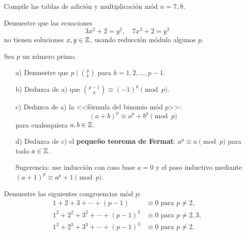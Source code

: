 \documentclass{article}
\begin{document}
\begin{problema}
  Compile las tablas de adición y multiplicación mód $n = 7, 8$.
\end{problema}

\begin{problema}
  Demuestre que las ecuaciones
  $$3x^2 + 2 = y^2, \quad 7x^3 + 2 = y^3$$
  no tienen soluciones $x,y \in \mathbb{Z}$, usando reducción módulo algunos $p$.
\end{problema}

\begin{problema}
  \label{probl:pequeno-Fermat}
  Sea $p$ un número primo.

  \begin{enumerate}
  \item[a)] Demuestre que $p\mid {p\choose k}$ para $k = 1,2,\ldots,p-1$.

  \item[b)] Deduzca de a) que ${p-1\choose k} \equiv (-1)^k \pmod{p}$.

  \item[c)] Deduzca de a) la <<fórmula del binomio mód $p$>>:
    $$(a+b)^p \equiv a^p + b^p \pmod{p}$$
    para cualesquiera $a,b \in \mathbb{Z}$.

  \item[d)] Deduzca de c) el \textbf{pequeño teorema de Fermat}:
    $a^p \equiv a \pmod{p}$ para todo $a \in \mathbb{Z}$.

    Sugerencia: use inducción con caso base $a = 0$ y el paso inductivo mediante
    $(a+1)^p \equiv a^p + 1 \pmod{p}$.
  \end{enumerate}
\end{problema}

\begin{problema}
  Demuestre las siguientes congruencias mód $p$:
  \begin{align*}
    1 + 2 + 3 + \cdots + (p-1) & \equiv 0 \text{ para }p \ne 2,\\
    1^2 + 2^2 + 3^2 + \cdots + (p-1)^2 & \equiv 0 \text{ para }p \ne 2,3,\\
    1^3 + 2^3 + 3^3 + \cdots + (p-1)^3 & \equiv 0 \text{ para }p \ne 2.
  \end{align*}
\end{problema}
\end{document}
